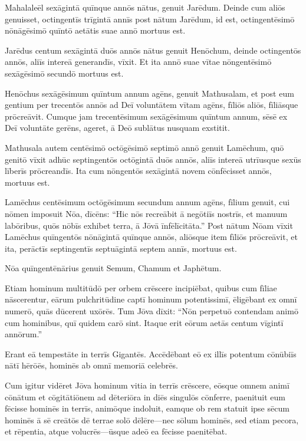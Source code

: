 \Versus Mahalaleēl sexāgintā quīnque annōs nātus, genuit Jarēdum.
\Versus Deinde cum aliōs genuisset, octingentīs trīgintā annīs post nātum Jarēdum,
\Versus id est, octingentēsimō nōnāgēsimō quīntō aetātis suae annō mortuus est.

\Versus Jarēdus centum sexāgintā duōs annōs nātus genuit Henōchum,
\Versus deinde octingentōs annōs, aliīs intereā generandīs, vīxit.
\Versus Et ita annō suae vītae nōngentēsimō sexāgēsimō secundō mortuus est.

\Versus Henōchus sexāgēsimum quīntum annum agēns, genuit Mathusalam,
\Versus et post eum gentium per trecentōs annōs ad Deī voluntātem vītam agēns, fīliōs aliōs, fīliāsque prōcreāvit.
\Versus Cumque jam trecentēsimum sexāgēsimum quīntum annum,
\Versus sēsē ex Deī voluntāte gerēns, ageret, ā Deō sublātus nusquam exstitit.

\Versus Mathusala autem centēsimō octōgēsimō septimō annō genuit Lamēchum,
\Versus quō genitō vīxit adhūc septingentōs octōgintā duōs annōs, aliīs intereā utrīusque sexūs līberīs prōcreandīs.
\Versus Ita cum nōngentōs sexāgintā novem cōnfēcisset annōs, mortuus est.

\Versus Lamēchus centēsimum octōgēsimum secundum annum agēns, fīlium genuit,
\Versus cui nōmen imposuit Nōa, dīcēns: ``Hic nōs recreābit ā negōtiīs nostrīs, et manuum labōribus, quōs nōbīs exhibet terra, ā Jōvā īnfēlīcitāta.''
\Versus Post nātum Nōam vīxit Lamēchus quīngentōs nōnāgintā quīnque annōs, aliōsque item fīliōs prōcreāvit,
\Versus et ita, perāctīs septingentīs septuāgintā septem annīs, mortuus est.

\Versus Nōa quīngentēnārius genuit Semum, Chamum et Japhētum.



\Caput
\Versus Etiam hominum multitūdō per orbem crēscere incipiēbat, quibus cum fīliae nāscerentur,
\Versus eārum pulchritūdine captī hominum potentissimī, ēligēbant ex omnī numerō, quās dūcerent uxōrēs.
\Versus Tum Jōva dīxit: ``Nōn perpetuō contendam animō cum hominibus, quī quidem carō sint. Itaque erit eōrum aetās centum vīgintī annōrum.''

\Versus Erant eā tempestāte in terrīs Gigantēs. Accēdēbant eō ex illīs potentum cōnūbiīs nātī hērōēs, hominēs ab omnī memoriā celebrēs.

\Versus Cum igitur vidēret Jōva hominum vitia in terrīs crēscere, eōsque omnem animī cōnātum et cōgitātiōnem ad dēteriōra in diēs singulōs cōnferre,
\Versus paenituit eum fēcisse hominēs in terrīs, animōque indoluit,
\Versus eamque ob rem statuit ipse sēcum hominēs ā sē creātōs dē terrae solō dēlēre—nec sōlum hominēs, sed etiam pecora, et rēpentia, atque volucrēs—ūsque adeō ea fēcisse paenitēbat.

